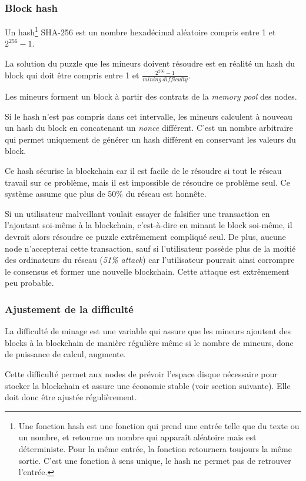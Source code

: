 \documentclass{article}
\begin{document}
\subsubsection{Block hash}

Un hash\footnote{Une fonction hash est une fonction qui prend une entrée telle que du texte ou un nombre, et retourne un nombre qui apparaît aléatoire mais est déterministe. Pour la même entrée, la fonction retournera toujours la même sortie. C'est une fonction à sens unique, le hash ne permet pas de retrouver l'entrée.} SHA-256 est un nombre hexadécimal aléatoire compris entre 1 et $2^{256} - 1$.

La solution du puzzle que les mineurs doivent résoudre est en réalité un hash du block qui doit être compris entre 1 et $\frac{2^{256}-1}{mining\ difficulty}$.

Les mineurs forment un block à partir des contrats de la \textit{memory pool} des nodes.

Si le hash n'est pas compris dans cet intervalle, les mineurs calculent à nouveau un hash du block en concatenant un \textit{nonce} différent. C'est un nombre arbitraire qui permet uniquement de générer un hash différent en conservant les valeurs du block.

Ce hash sécurise la blockchain car il est facile de le résoudre si tout le réseau travail sur ce problème, mais il est impossible de résoudre ce problème seul. Ce système assume que plus de 50\% du réseau est honnête.

Si un utilisateur malveillant voulait essayer de falsifier une transaction en l'ajoutant soi-même à la blockchain, c'est-à-dire en minant le block soi-même, il devrait alors résoudre ce puzzle extrêmement compliqué seul. De plus, aucune node n'accepterai cette transaction, sauf si l'utilisateur possède plus de la moitié des ordinateurs du réseau (\textit{51\% attack}) car l'utilisateur pourrait ainsi corrompre le consensus et former une nouvelle blockchain.
Cette attaque est extrêmement peu probable.

\subsubsection{Ajustement de la difficulté}

La difficulté de minage est une variable qui assure que les mineurs ajoutent des blocks à la blockchain de manière régulière même si le nombre de mineurs, donc de puissance de calcul, augmente.
 
Cette difficulté permet aux nodes de prévoir l’espace disque nécessaire pour stocker la blockchain et assure une économie stable (voir section suivante). Elle doit donc être ajustée régulièrement.
\end{document}
